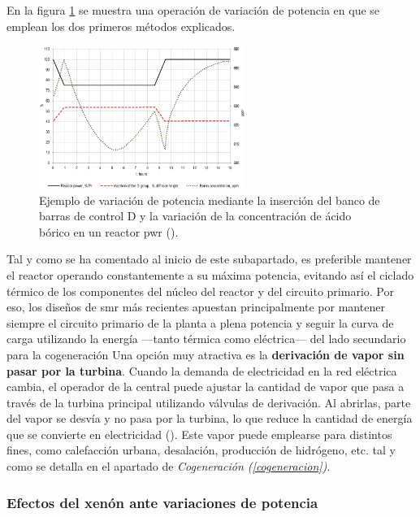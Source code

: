 En la figura \ref{fig:seguimiento_carga_barras_y_boro} se muestra una operación de variación de potencia en que se emplean los dos primeros métodos explicados.

\begin{figure}[h]
  \centering
  \includegraphics[width=0.6\textwidth]{content/figures/seguimiento_carga_barras_y_boro.png}
  \caption{Ejemplo de variación de potencia mediante la inserción del banco de barras de control D y la variación de la concentración de ácido bórico en un reactor \acrshort{pwr} (\cite{NEA_2011_load_following}).}
  \label{fig:seguimiento_carga_barras_y_boro}
\end{figure}

Tal y como se ha comentado al inicio de este subapartado, es preferible mantener el reactor operando constantemente a su máxima potencia, evitando así el ciclado térmico de los componentes del núcleo del reactor y del circuito primario. Por eso, los diseños de \acrshort{smr} más recientes apuestan principalmente por mantener siempre el circuito primario de la planta a plena potencia y seguir la curva de carga utilizando la energía ---tanto térmica como eléctrica--- del lado secundario para la cogeneración Una opción muy atractiva es la \textbf{derivación de vapor sin pasar por la turbina}. Cuando la demanda de electricidad en la red eléctrica cambia, el operador de la central puede ajustar la cantidad de vapor que pasa a través de la turbina principal utilizando válvulas de derivación. Al abrirlas, parte del vapor se desvía y no pasa por la turbina, lo que reduce la cantidad de energía que se convierte en electricidad (\cite{ANS_2019}). Este vapor puede emplearse para distintos fines, como calefacción urbana, desalación, producción de hidrógeno, etc. tal y como se detalla en el apartado de \textit{Cogeneración (\ref{cogeneracion})}. 

\subsubsection{Efectos del xenón ante variaciones de potencia}

